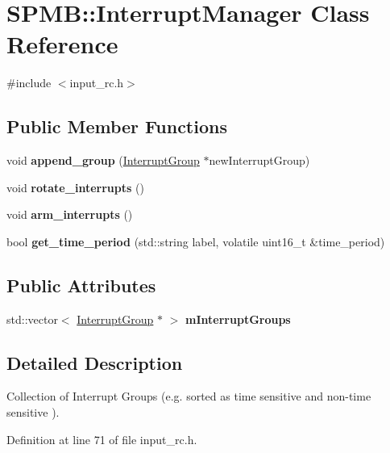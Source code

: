 \hypertarget{classSPMB_1_1InterruptManager}{}\section{S\+P\+MB\+:\+:Interrupt\+Manager Class Reference}
\label{classSPMB_1_1InterruptManager}


{\ttfamily \#include $<$input\+\_\+rc.\+h$>$}

\subsection*{Public Member Functions}
\begin{DoxyCompactItemize}
\item 
void {\bfseries append\+\_\+group} (\hyperlink{classSPMB_1_1InterruptGroup}{Interrupt\+Group} $\ast$new\+Interrupt\+Group)\hypertarget{classSPMB_1_1InterruptManager_a7848e944d851bf3bcc251e03e673433c}{}\label{classSPMB_1_1InterruptManager_a7848e944d851bf3bcc251e03e673433c}

\item 
void {\bfseries rotate\+\_\+interrupts} ()\hypertarget{classSPMB_1_1InterruptManager_a281ff95c62f2c714024009fbdfad560e}{}\label{classSPMB_1_1InterruptManager_a281ff95c62f2c714024009fbdfad560e}

\item 
void {\bfseries arm\+\_\+interrupts} ()\hypertarget{classSPMB_1_1InterruptManager_ae6d936207409563b307e3f0bbced7dbc}{}\label{classSPMB_1_1InterruptManager_ae6d936207409563b307e3f0bbced7dbc}

\item 
bool {\bfseries get\+\_\+time\+\_\+period} (std\+::string label, volatile uint16\+\_\+t \&time\+\_\+period)\hypertarget{classSPMB_1_1InterruptManager_abef4d7dfc94ed70cb9b137803d75ebe4}{}\label{classSPMB_1_1InterruptManager_abef4d7dfc94ed70cb9b137803d75ebe4}

\end{DoxyCompactItemize}
\subsection*{Public Attributes}
\begin{DoxyCompactItemize}
\item 
std\+::vector$<$ \hyperlink{classSPMB_1_1InterruptGroup}{Interrupt\+Group} $\ast$ $>$ {\bfseries m\+Interrupt\+Groups}\hypertarget{classSPMB_1_1InterruptManager_a103e2348c57eecaab0605c196f3b924b}{}\label{classSPMB_1_1InterruptManager_a103e2348c57eecaab0605c196f3b924b}

\end{DoxyCompactItemize}


\subsection{Detailed Description}
Collection of Interrupt Groups (e.\+g. sorted as time sensitive and non-\/time sensitive ). 

Definition at line 71 of file input\+\_\+rc.\+h.

